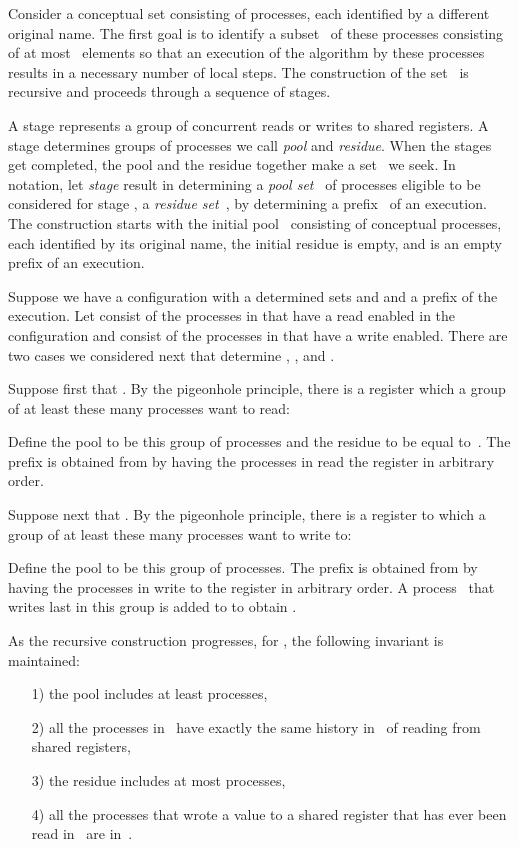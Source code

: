 \documentclass[11pt]{article}
\newcommand{\qed}{\hfill  \smallbreak}
\newenvironment{proof}{\noindent{\bf Proof:}}{\qed}
\begin{document}
\begin{proof} 
Consider a conceptual set consisting of  processes, each identified by a different original name.
The first goal is to identify a subset~ of these processes consisting of at most~ elements so that an execution of the algorithm by these processes results in a necessary number of local steps. 
The construction of the set~ is recursive and proceeds through a sequence of stages.

A stage represents a group of concurrent reads or writes to shared registers.
A stage determines groups of processes we call \emph{pool} and \emph{residue}.
When the stages get completed, the pool and the residue together make a set~ we seek.
In notation, let \emph{stage } result in determining a \emph{pool set~} of processes eligible to be considered for stage , a \emph{residue set~}, by determining a prefix~ of an execution.
The construction starts with the initial pool~ consisting of  conceptual processes, each identified by its  original name, the initial residue  is empty, and  is  an empty prefix of an execution.


Suppose we have a configuration with a determined sets  and  and a prefix  of the execution.
Let  consist of the processes in  that have a read enabled in the configuration and  consist of the processes in  that have a write enabled.
There are two cases we considered next that determine , , and .

Suppose first that .
By the pigeonhole principle, there is a register which a group of at least these many processes want to read:
 
Define the pool  to be this group of processes and the residue  to be equal to~. 
The prefix  is obtained from  by having the processes in  read the register in arbitrary order. 

Suppose next that .
By the pigeonhole principle, there is a register to which  a group of at least these many processes want to write to:
 
Define the pool  to be this group of processes.
The prefix  is obtained from  by having the processes in  write to the register in arbitrary order. 
A process~ that writes last in this group is added to  to obtain .

As the recursive construction progresses, for , the following invariant is maintained:
\begin{enumerate}
\item[1)]
the pool  includes at least  processes, 
\item[2)]
all the processes in~ have exactly the same history in~ of reading from  shared registers,
\item[3)] 
the residue  includes  at most  processes,
\item[4)]
all the processes that wrote a value to a shared register that has ever been read in~  are in~. 
\end{enumerate}


\end{proof}
\end{document}

